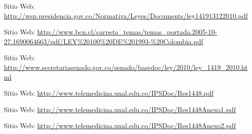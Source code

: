 \documentclass[12pt,graphicx,caption,rotating]{article}
\begin{document}
\begin{thebibliography}{99}

 Sitio Web: \url{http://wsp.presidencia.gov.co/Normativa/Leyes/Documents/ley141913122010.pdf}

 Sitio Web: \url{http://www.bcn.cl/carpeta_temas/temas_portada.2005-10-27.1690064663/pdf/LEY%20100%20DE%201993-%20Colombia.pdf}

 Sitio Web: \url{http://www.secretariasenado.gov.co/senado/basedoc/ley/2010/ley_1419_2010.html}

 Sitio Web: \url{http://www.telemedicina.unal.edu.co/IPSDoc/Res1448.pdf}

 Sitio Web: \url{http://www.telemedicina.unal.edu.co/IPSDoc/Res1448Anexo1.pdf}

 Sitio Web: \url{http://www.telemedicina.unal.edu.co/IPSDoc/Res1448Anexo2.pdf}
\end{thebibliography}
\end{document}
